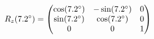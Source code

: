 \documentclass[preview]{standalone}
\begin{document}
\begin{align*}
\special{dvisvgm:raw <g id='unique000'>}R_z(7.2^\circ) = \begin{pmatrix} \cos(7.2^\circ) & -\sin(7.2^\circ) & 0 \\ \sin(7.2^\circ) & \cos(7.2^\circ) & 0 \\ 0 & 0 & 1 \end{pmatrix}\special{dvisvgm:raw </g>}
\end{align*}
\end{document}
